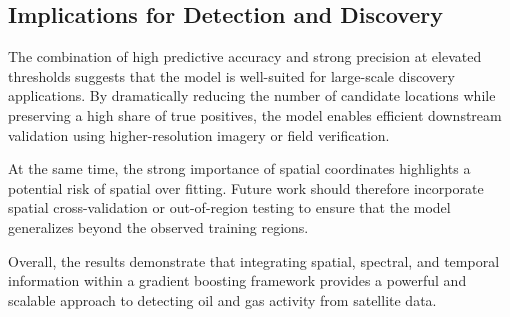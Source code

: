 \documentclass[12pt]{article}
\begin{document}
\subsection{Implications for Detection and Discovery}

The combination of high predictive accuracy and strong precision at elevated thresholds suggests that the model is well-suited for large-scale discovery applications. By dramatically reducing the number of candidate locations while preserving a high share of true positives, the model enables efficient downstream validation using higher-resolution imagery or field verification.

At the same time, the strong importance of spatial coordinates highlights a potential risk of spatial over fitting. Future work should therefore incorporate spatial cross-validation or out-of-region testing to ensure that the model generalizes beyond the observed training regions.

Overall, the results demonstrate that integrating spatial, spectral, and temporal information within a gradient boosting framework provides a powerful and scalable approach to detecting oil and gas activity from satellite data.
\end{document}
